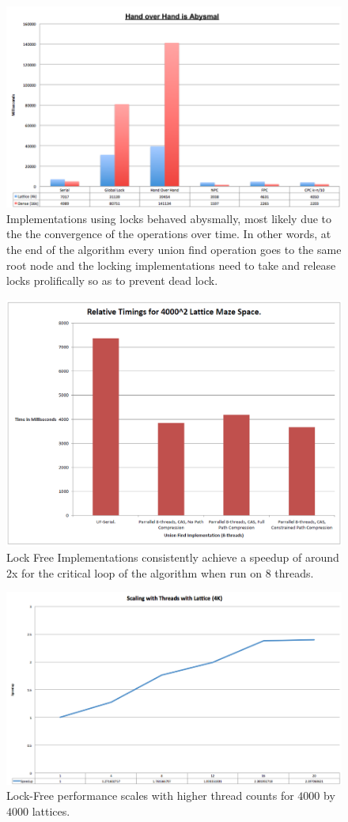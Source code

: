 \documentclass[11pt]{article}
\begin{document}
\begin{figure}[h]
\centering
\includegraphics[width=\textwidth]{Results-Locking}
\caption{Implementations using locks behaved abysmally, most likely due to the the convergence of the operations over time. In other words, at the end of the algorithm every union find operation goes to the same root node and the locking implementations need to take and release locks prolifically so as to prevent dead lock.}
\label{fig:Results-bad-locking}
\end{figure}


\begin{figure}[h]
\centering
\includegraphics[width=\textwidth]{LockFreeTimings}
\caption{Lock Free Implementations consistently achieve a speedup of around 2x for the critical loop of the algorithm when run on 8 threads.}
\label{fig:Results-Lock-Free-Canonical}
\end{figure}


\begin{figure}[h]
\centering
\includegraphics[width=\textwidth]{PerformanceScaling}
\caption{Lock-Free performance scales with higher thread counts for $4000$ by $4000$ lattices.}
\label{fig:Results-Scaling}
\end{figure}
\end{document}
